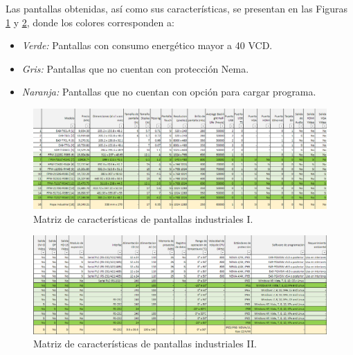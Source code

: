 Las pantallas obtenidas, así como sus características, se presentan en las Figuras \ref{fig:Pantalla1} y \ref{fig:Pantalla2}, donde los colores corresponden a:

\begin{itemize} 
	\item \textit{Verde:} Pantallas con consumo energético mayor a 40 VCD.
	\item \textit{Gris:} Pantallas que no cuentan con protección Nema.
	\item \textit{Naranja:} Pantallas que no cuentan con opción para cargar programa.
\end{itemize}

\newpage
\begin{landscape}
	\begin{figure}[H]
		\centering
		\includegraphics[width=\columnwidth]{imagenes/Pantalla1}
		\caption{Matriz de características de pantallas industriales I.}
		\label{fig:Pantalla1}
	\end{figure}
	
	\begin{figure}[H]
		\centering
		\includegraphics[width=\columnwidth]{imagenes/Pantalla2}
		\caption{Matriz de características de pantallas industriales II.}
		\label{fig:Pantalla2}
	\end{figure}
\end{landscape}

